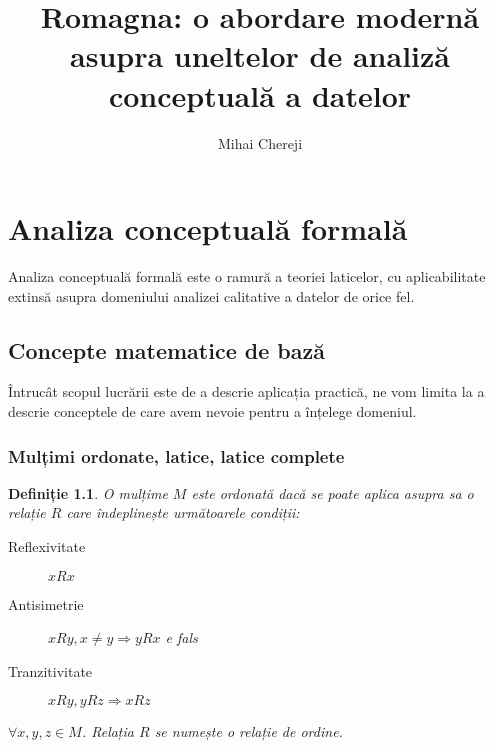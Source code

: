 \documentclass[12pt, a4paper, twoside, romanian]{teza-upb}
\newtheorem{defn}{Definiție}
\begin{document}
\author{Mihai Chereji}

\title{Romagna: o abordare modernă asupra uneltelor de analiză conceptuală a datelor}




\beforepreface
\listoffigures
\listoftables
{}
\afterpreface 


\chapter{Analiza conceptuală formală}
  Analiza conceptuală formală este o ramură a teoriei laticelor, cu aplicabilitate extinsă asupra domeniului analizei calitative a datelor de orice fel.
  \section{Concepte matematice de bază}
    Întrucât scopul lucrării este de a descrie aplicația practică, ne vom limita la a descrie conceptele de care avem nevoie pentru a înțelege domeniul.
    \subsection{Mulțimi ordonate, latice, latice complete}
    \begin{defn}
      O mulțime $M$ este ordonată dacă se poate aplica asupra sa o relație $R$ care îndeplinește următoarele condiții:
      \begin{description}
        \item [Reflexivitate] $xRx$
        \item [Antisimetrie] $xRy, x \neq y \Rightarrow yRx$ e fals
        \item [Tranzitivitate] $xRy, yRz \Rightarrow xRz$
      \end{description}
      $\forall x, y,z \in M$. Relația $R$ se numește o \emph{relație de ordine}.
    \end{defn}
\end{document}
